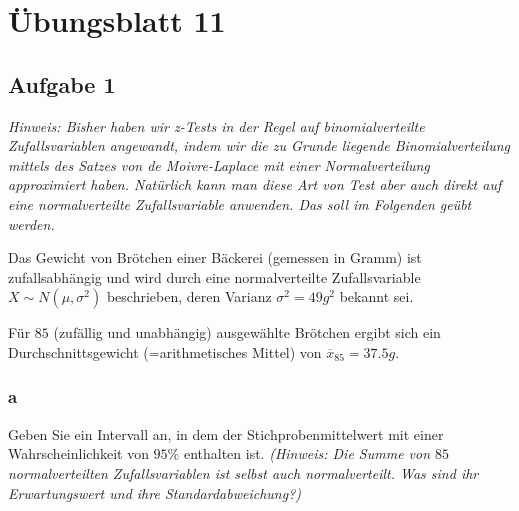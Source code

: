 \chapter{Übungsblatt 11}

\section{Aufgabe 1}

\textit{Hinweis: Bisher haben wir z-Tests in der Regel auf binomialverteilte Zufallsvariablen
    angewandt, indem wir die zu Grunde liegende Binomialverteilung mittels des Satzes von de
    Moivre-Laplace mit einer Normalverteilung approximiert haben. Natürlich kann man diese Art
    von Test aber auch direkt auf eine normalverteilte Zufallsvariable anwenden. Das soll im
    Folgenden geübt werden.}

Das Gewicht von Brötchen einer Bäckerei (gemessen in Gramm) ist zufallsabhängig
und wird durch eine normalverteilte Zufallsvariable $X \sim N(\mu, \sigma^2)$
beschrieben, deren Varianz $\sigma^2 = 49g^2$ bekannt sei.

Für $85$ (zufällig und unabhängig) ausgewählte Brötchen ergibt sich ein
Durchschnittsgewicht (=arithmetisches Mittel) von $\overline{x}_{85} = 37.5g$.

\subsection{a}
Geben Sie ein Intervall an, in dem der Stichprobenmittelwert mit einer
Wahrscheinlichkeit von $95\%$ enthalten ist. \textit{(Hinweis: Die Summe von
    $85$ normalverteilten Zufallsvariablen ist selbst auch normalverteilt. Was sind
    ihr Erwartungswert und ihre Standardabweichung?)}

